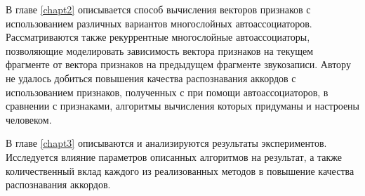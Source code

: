 В главе \ref{chapt2} описывается способ вычисления векторов признаков с
использованием различных вариантов многослойных автоассоциаторов.
Рассматриваются также рекуррентные многослойные автоассоциаторы, позволяющие
моделировать зависимость вектора признаков на текущем фрагменте от вектора
признаков на предыдущем фрагменте звукозаписи. Автору не удалось добиться
повышения качества распознавания аккордов с использованием признаков,
полученных с при помощи автоассоциаторов, в сравнении с признаками, алгоритмы
вычисления которых придуманы и настроены человеком.

В главе \ref{chapt3} описываются и анализируются результаты экспериментов.
Исследуется влияние параметров описанных алгоритмов на результат, а также
количественный вклад каждого из реализованных методов в повышение качества
распознавания аккордов.


% 





